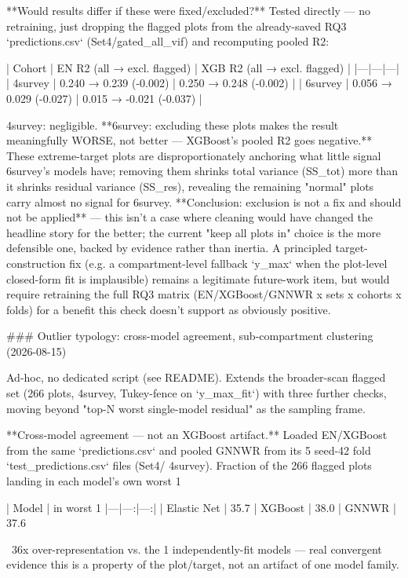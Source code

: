 **Would results differ if these were fixed/excluded?** Tested directly — no retraining, just
dropping the flagged plots from the already-saved RQ3 `predictions.csv` (Set4/gated_all_vif) and
recomputing pooled R2:

| Cohort | EN R2 (all → excl. flagged) | XGB R2 (all → excl. flagged) |
|---|---|---|
| 4survey | 0.240 → 0.239 (-0.002) | 0.250 → 0.248 (-0.002) |
| 6survey | 0.056 → 0.029 (-0.027) | 0.015 → -0.021 (-0.037) |

4survey: negligible. **6survey: excluding these plots makes the result meaningfully WORSE, not
better — XGBoost's pooled R2 goes negative.** These extreme-target plots are disproportionately
anchoring what little signal 6survey's models have; removing them shrinks total variance (SS_tot)
more than it shrinks residual variance (SS_res), revealing the remaining "normal" plots carry
almost no signal for 6survey. **Conclusion: exclusion is not a fix and should not be applied** —
this isn't a case where cleaning would have changed the headline story for the better; the current
"keep all plots in" choice is the more defensible one, backed by evidence rather than inertia. A
principled target-construction fix (e.g. a compartment-level fallback `y_max` when the plot-level
closed-form fit is implausible) remains a legitimate future-work item, but would require retraining
the full RQ3 matrix (EN/XGBoost/GNNWR x sets x cohorts x folds) for a benefit this check doesn't
support as obviously positive.

### Outlier typology: cross-model agreement, sub-compartment clustering (2026-08-15)

Ad-hoc, no dedicated script (see README). Extends the broader-scan flagged set (266 plots,
4survey, Tukey-fence on `y_max_fit`) with three further checks, moving beyond "top-N worst
single-model residual" as the sampling frame.

**Cross-model agreement — not an XGBoost artifact.** Loaded EN/XGBoost from the same
`predictions.csv` and pooled GNNWR from its 5 seed-42 fold `test_predictions.csv` files (Set4/
4survey). Fraction of the 266 flagged plots landing in each model's own worst 1%

| Model | in worst 1%
|---|---:|---:|
| Elastic Net | 35.7%
| XGBoost | 38.0%
| GNNWR | 37.6%

~36x over-representation vs. the 1%
independently-fit models — real convergent evidence this is a property of the plot/target, not an
artifact of one model family.

